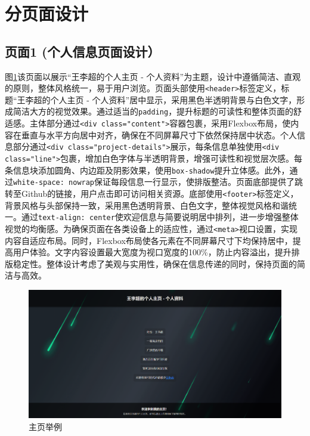 \documentclass[supercite]{Experimental_Report}
\theoremstyle{definition}
\begin{document}
\newpage

\section{分页面设计}

\subsection{页面1 (个人信息页面设计）}

图\ref{fig3-1}该页面以展示“王李超的个人主页 - 个人资料”为主题，设计中遵循简洁、直观的原则，整体风格统一，易于用户浏览。页面头部使用\texttt{<header>}标签定义，标题“王李超的个人主页 - 个人资料”居中显示，采用黑色半透明背景与白色文字，形成简洁大方的视觉效果。通过适当的\texttt{padding}，提升标题的可读性和整体页面的舒适感。主体部分通过\texttt{<div class="content">}容器包裹，采用Flexbox布局，使内容在垂直与水平方向居中对齐，确保在不同屏幕尺寸下依然保持居中状态。个人信息部分通过\texttt{<div class="project-details">}展示，每条信息单独使用\texttt{<div class="line">}包裹，增加白色字体与半透明背景，增强可读性和视觉层次感。每条信息块添加圆角、内边距及阴影效果，使用\texttt{box-shadow}提升立体感。此外，通过\texttt{white-space: nowrap}保证每段信息一行显示，使排版整洁。页面底部提供了跳转至Github的链接，用户点击即可访问相关资源。底部使用\texttt{<footer>}标签定义，背景风格与头部保持一致，采用黑色透明背景、白色文字，整体视觉风格和谐统一。通过\texttt{text-align: center}使欢迎信息与简要说明居中排列，进一步增强整体视觉的均衡感。为确保页面在各类设备上的适应性，通过\texttt{<meta>}视口设置，实现内容自适应布局。同时，Flexbox布局使各元素在不同屏幕尺寸下均保持居中，提高用户体验。文字内容设置最大宽度为视口宽度的100\%，防止内容溢出，提升排版稳定性。整体设计考虑了美观与实用性，确保在信息传递的同时，保持页面的简洁与高效。

\begin{figure}[htb]
	\begin{center}
		\includegraphics[scale=0.20]{images/3-1.png}
		\caption{主页举例}
		\label{fig3-1}
	\end{center}
\end{figure}
\end{document}
